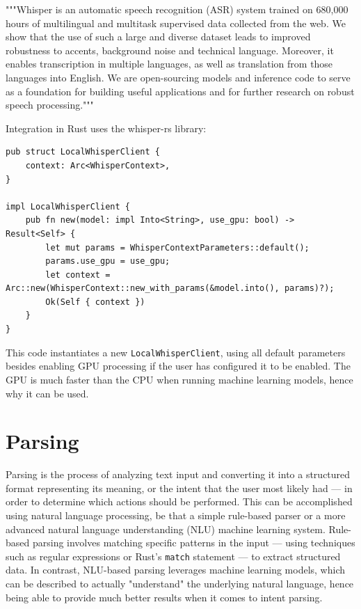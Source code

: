 """Whisper is an automatic speech recognition (ASR) system trained on 680,000 hours
of multilingual and multitask supervised data collected from the web.
We show that the use of such a large and diverse dataset leads to improved robustness to accents,
background noise and technical language.
Moreover, it enables transcription in multiple languages,
as well as translation from those languages into English.
We are open-sourcing models and inference code to serve as a foundation for building useful applications
and for further research on robust speech processing."""

Integration in Rust uses the whisper-rs library:

\begin{verbatim}
pub struct LocalWhisperClient {
    context: Arc<WhisperContext>,
}

impl LocalWhisperClient {
    pub fn new(model: impl Into<String>, use_gpu: bool) -> Result<Self> {
        let mut params = WhisperContextParameters::default();
        params.use_gpu = use_gpu;
        let context = Arc::new(WhisperContext::new_with_params(&model.into(), params)?);
        Ok(Self { context })
    }
}
\end{verbatim}

This code instantiates a new \texttt{LocalWhisperClient}, using all default parameters besides enabling GPU processing
if the user has configured it to be enabled.
The GPU is much faster than the CPU when running machine learning models, hence why it can be used.

\section{Parsing}
Parsing is the process of analyzing text input and converting it
into a structured format representing its meaning, or the intent that the user most likely had ---
in order to determine which actions should be performed.
This can be accomplished using natural language processing,
be that a simple rule-based parser or a more advanced natural language understanding (NLU) machine learning system.
Rule-based parsing involves matching specific patterns in the input ---
using techniques such as regular expressions or Rust's \texttt{match} statement --- to extract structured data.
In contrast, NLU-based parsing leverages machine learning models, which can be described to actually "understand"
the underlying natural language, hence being able to provide much better results when it comes to intent parsing.

